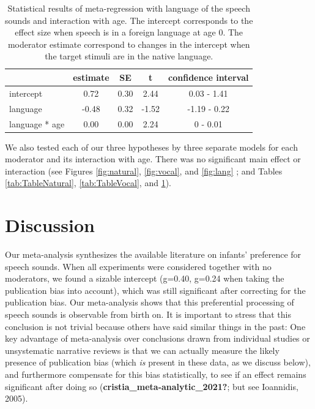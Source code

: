 \documentclass[
  english,
  man]{apa6}
\begin{document}
\begin{table}[tbp]

\begin{center}
\begin{threeparttable}

\caption{\label{tab:TableLang}Statistical results of meta-regression with language of the speech sounds and interaction with age. The intercept corresponds to the effect size when speech is in a foreign language at age 0. The moderator estimate correspond to changes in the intercept when the target stimuli are in the native language.}

\begin{tabular}{lcccc}
\toprule
 & estimate & SE & t & confidence interval\\
\midrule
intercept & 0.72 & 0.30 & 2.44 & 0.03 - 1.41\\
language & -0.48 & 0.32 & -1.52 & -1.19 - 0.22\\
language * age & 0.00 & 0.00 & 2.24 & 0 - 0.01\\
\bottomrule
\end{tabular}

\end{threeparttable}
\end{center}

\end{table}

We also tested each of our three hypotheses by three separate models for each moderator and its interaction with age. There was no significant main effect or interaction (see Figures \ref{fig:natural}, \ref{fig:vocal}, and \ref{fig:lang} ; and Tables \ref{tab:TableNatural}, \ref{tab:TableVocal}, and \ref{tab:TableLang}).

\hypertarget{discussion}{%
\section{Discussion}\label{discussion}}

Our meta-analysis synthesizes the available literature on infants' preference for speech sounds. When all experiments were considered together with no moderators, we found a sizable intercept (g=0.40, g=0.24 when taking the publication bias into account), which was still significant after correcting for the publication bias. Our meta-analysis shows that this preferential processing of speech sounds is observable from birth on. It is important to stress that this conclusion is not trivial because others have said similar things in the past: One key advantage of meta-analysis over conclusions drawn from individual studies or unsystematic narrative reviews is that we can actually measure the likely presence of publication bias (which \emph{is} present in these data, as we discuss below), and furthermore compensate for this bias statistically, to see if an effect remains significant after doing so (\textbf{cristia\_meta-analytic\_2021?}; but see Ioannidis, 2005).
\end{document}

